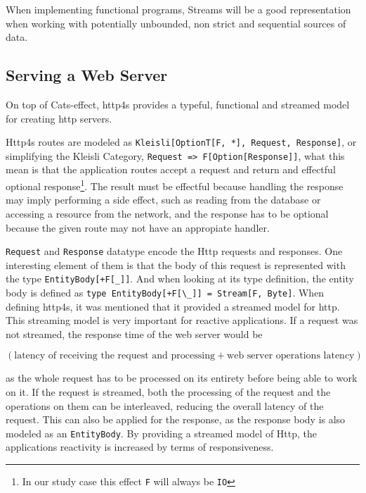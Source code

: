 \documentclass[../main.tex]{subfiles}
\begin{document}


When implementing functional programs, Streams will be a good representation when working with
potentially unbounded, non strict and sequential sources of data.

\subsection{Serving a Web Server}
On top of Cats-effect, http4s provides a typeful, functional and streamed model
for creating http servers.

Http4s routes are modeled as \mbox{\texttt{Kleisli[OptionT[F,
*], Request, Response]}}, or simplifying the Kleisli Category, \mbox{\lstinline{Request => F[Option[Response]]}},
what this mean is that the application routes accept a request and return and
effectful optional response\footnote{In our study case this effect \texttt{F}
  will always be \texttt{IO}}. The result must be effectful because handling the
response may imply performing a side effect, such as reading from the database or
accessing a resource from the network, and the response has to be optional
because the given route may not have an appropiate handler.

\texttt{Request} and \texttt{Response} datatype encode the Http requests and
responses. One interesting element of them is that the body of this request is
represented with the type \texttt{EntityBody[+F[\_]]}. And when looking at its
type definition, the entity body is defined as
\lstinline{type EntityBody[+F[\_]] = Stream[F, Byte]}.
When defining http4s, it was mentioned that it provided a streamed model for
http. This streaming model is very important for reactive applications. If a
request was not streamed, the response time of the web
server would be

\begin{center}
$(\text{latency of receiving the request and processing} +
\text{web server operations latency})$
\end{center}

as the whole request has to be processed on its
entirety before being able to work on it. If the request is streamed, both
the processing of the request and the operations on them can be interleaved,
reducing the overall latency of the request. This can also be applied for the
response, as the response body is also modeled as an \texttt{EntityBody}. By
providing a streamed model of Http, the applications reactivity is increased by
terms of responsiveness.
\end{document}
